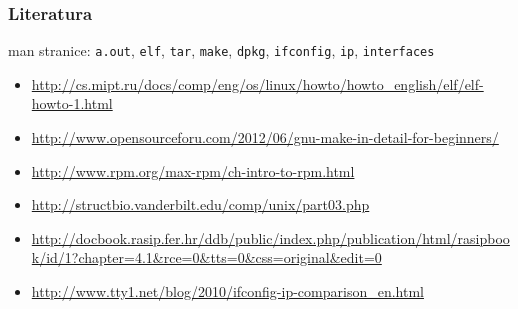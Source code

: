 \documentclass[table,usenames,dvipsnames]{beamer}
\newcommand{\shell}[1]{\texttt{#1}}
\begin{document}
\begin{frame}[t]
	\frametitle{Literatura}
	man stranice: \shell{a.out}, \shell{elf}, \shell{tar}, \shell{make}, \shell{dpkg}, \shell{ifconfig}, \shell{ip}, \shell{interfaces}
	
	\begin{itemize}
		\item \url{http://cs.mipt.ru/docs/comp/eng/os/linux/howto/howto\_english/elf/elf-howto-1.html}
		\item \url{http://www.opensourceforu.com/2012/06/gnu-make-in-detail-for-beginners/}
		\item \url{http://www.rpm.org/max-rpm/ch-intro-to-rpm.html}
		\item \url{http://structbio.vanderbilt.edu/comp/unix/part03.php}
		\item \url{http://docbook.rasip.fer.hr/ddb/public/index.php/publication/html/rasipbook/id/1?chapter=4.1&rce=0&tts=0&css=original&edit=0}
		\item \url{http://www.tty1.net/blog/2010/ifconfig-ip-comparison_en.html}
	\end{itemize}
\end{frame}
	
\end{document}
